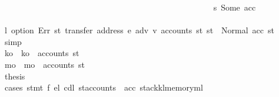 \begin{isabellebody}
\ \ \ \ \ \ \ \ \ \ \ \ \ \ \ \ \ \ \ \ \ \ \ \ \ \ \ \ \ \ \ \ \ \ \ \ \ \ \ \ \ \ \ \ \ \ \ \ \ \ \isamarkupfalse%
\ s{}{\isacharcolon}{\kern0pt}\ {\isacharparenleft}{\kern0pt}Some\ acc{\isacharparenright}{\kern0pt}\isanewline
\ \ \ \ \ \ \ \ \ \ \ \ \ \ \ \ \ \ \ \ \ \ \ \ \ \ \ \ \ \ \ \ \ \ \ \ \ \ \ \ \ \ \ \ \ \ \ \ \ \ \isamarkupfalse%
\ \isamarkupfalse%
\ l{}{}{\isacharcolon}{\kern0pt}\ {\isachardoublequoteopen}option\ Err\ {\isacharparenleft}{\kern0pt}{\isasymlambda}st{\isachardot}{\kern0pt}\ transfer\ {\isacharparenleft}{\kern0pt}address\ e{\isacharparenright}{\kern0pt}\ adv\ v{\isacharprime}{\kern0pt}\ {\isacharparenleft}{\kern0pt}accounts\ st{\isacharparenright}{\kern0pt}{\isacharparenright}{\kern0pt}\ st{\isacharprime}{\kern0pt}{\isacharprime}{\kern0pt}{\isacharprime}{\kern0pt}{\isacharprime}{\kern0pt}\ {\isacharequal}{\kern0pt}\ Normal\ {\isacharparenleft}{\kern0pt}acc{\isacharcomma}{\kern0pt}\ st{\isacharprime}{\kern0pt}{\isacharprime}{\kern0pt}{\isacharprime}{\kern0pt}{\isacharprime}{\kern0pt}{\isacharparenright}{\kern0pt}{\isachardoublequoteclose}\ \isamarkupfalse%
\ simp\isanewline
\ \ \ \ \ \ \ \ \ \ \ \ \ \ \ \ \ \ \ \ \ \ \ \ \ \ \ \ \ \ \ \ \ \ \ \ \ \ \ \ \ \ \ \ \ \ \ \ \ \ \isamarkupfalse%
\ k\isactrlsub o\ \ {\isachardoublequoteopen}k\isactrlsub o\ {\isacharequal}{\kern0pt}\ accounts\ st{\isacharprime}{\kern0pt}{\isacharprime}{\kern0pt}{\isacharprime}{\kern0pt}{\isacharprime}{\kern0pt}{\isachardoublequoteclose}\isanewline
\ \ \ \ \ \ \ \ \ \ \ \ \ \ \ \ \ \ \ \ \ \ \ \ \ \ \ \ \ \ \ \ \ \ \ \ \ \ \ \ \ \ \ \ \ \ \ \ \ \ \isamarkupfalse%
\ m\isactrlsub o\ \ {\isachardoublequoteopen}m\isactrlsub o\ {\isacharequal}{\kern0pt}\ accounts\ st{\isacharprime}{\kern0pt}{\isacharprime}{\kern0pt}{\isacharprime}{\kern0pt}{\isacharprime}{\kern0pt}{\isachardoublequoteclose}\isanewline
\ \ \ \ \ \ \ \ \ \ \ \ \ \ \ \ \ \ \ \ \ \ \ \ \ \ \ \ \ \ \ \ \ \ \ \ \ \ \ \ \ \ \ \ \ \ \ \ \ \ \isamarkupfalse%
\ {\isacharquery}{\kern0pt}thesis\isanewline
\ \ \ \ \ \ \ \ \ \ \ \ \ \ \ \ \ \ \ \ \ \ \ \ \ \ \ \ \ \ \ \ \ \ \ \ \ \ \ \ \ \ \ \ \ \ \ \ \ \ \isamarkupfalse%
\ {\isacharparenleft}{\kern0pt}cases\ {\isachardoublequoteopen}stmt\ f\ e\isactrlsub l\ cd\isactrlsub l\ {\isacharparenleft}{\kern0pt}st{\isacharprime}{\kern0pt}{\isacharprime}{\kern0pt}{\isacharprime}{\kern0pt}{\isacharprime}{\kern0pt}{\isasymlparr}accounts\ {\isacharcolon}{\kern0pt}{\isacharequal}{\kern0pt}\ acc{\isacharcomma}{\kern0pt}\ stack{\isacharcolon}{\kern0pt}{\isacharequal}{\kern0pt}k\isactrlsub l{\isacharcomma}{\kern0pt}memory{\isacharcolon}{\kern0pt}{\isacharequal}{\kern0pt}m\isactrlsub l{\isasymrparr}{\isacharparenright}{\kern0pt}{\isachardoublequoteclose}{\isacharparenright}{\kern0pt}\isanewline

\end{isabellebody}
